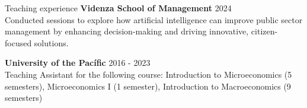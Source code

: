 \documentclass{resume} %
\begin{document}
\begin{rSection}{Teaching experience}
{\bf Videnza School of Management}  \hfill {2024}\\
Conducted sessions to explore how artificial intelligence can improve public sector management by enhancing decision-making and driving innovative, citizen-focused solutions.

{\bf University of the Pacífic}  \hfill {2016 - 2023}\\
Teaching Assistant for the following course: Introduction to Microeconomics (5 semesters), Microeconomics I (1 semester), Introduction to Macroeconomics (9 semesters)
\end{rSection}

\end{document}
